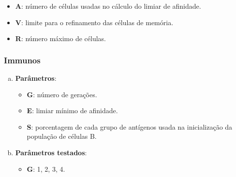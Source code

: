 \begin{enumerate}[a)]
\begin{itemize}
        \item \textbf{A}: número de células usadas no cálculo do limiar de afinidade.

        \item \textbf{V}: limite para o refinamento das células de memória.

        \item \textbf{R}: número máximo de células.
        \end{itemize}
\end{enumerate}

\subsubsection{Immunos}

\begin{enumerate}[a)]
    \item \textbf{Parâmetros}:
        \begin{itemize}

            \item \textbf{G}: número de gerações.

            \item \textbf{E}: limiar mínimo de afinidade.

            \item \textbf{S}: porcentagem de cada grupo de antígenos usada na inicialização da população de células B.
        \end{itemize}
    \item \textbf{Parâmetros testados}:
        \begin{itemize}
            \item \textbf{G}: 1, 2, 3, 4.
        \end{itemize}
\end{enumerate}

